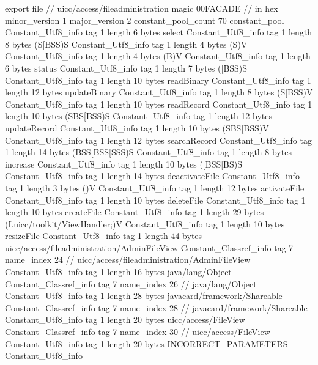 export file {		// uicc/access/fileadministration
	magic	00FACADE		 // in hex
	minor_version	1
	major_version	2
	constant_pool_count	70
	constant_pool {
		Constant_Utf8_info {
			tag	1
			length	6
			bytes	select
		}
		Constant_Utf8_info {
			tag	1
			length	8
			bytes	(S[BSS)S
		}
		Constant_Utf8_info {
			tag	1
			length	4
			bytes	(S)V
		}
		Constant_Utf8_info {
			tag	1
			length	4
			bytes	(B)V
		}
		Constant_Utf8_info {
			tag	1
			length	6
			bytes	status
		}
		Constant_Utf8_info {
			tag	1
			length	7
			bytes	([BSS)S
		}
		Constant_Utf8_info {
			tag	1
			length	10
			bytes	readBinary
		}
		Constant_Utf8_info {
			tag	1
			length	12
			bytes	updateBinary
		}
		Constant_Utf8_info {
			tag	1
			length	8
			bytes	(S[BSS)V
		}
		Constant_Utf8_info {
			tag	1
			length	10
			bytes	readRecord
		}
		Constant_Utf8_info {
			tag	1
			length	10
			bytes	(SBS[BSS)S
		}
		Constant_Utf8_info {
			tag	1
			length	12
			bytes	updateRecord
		}
		Constant_Utf8_info {
			tag	1
			length	10
			bytes	(SBS[BSS)V
		}
		Constant_Utf8_info {
			tag	1
			length	12
			bytes	searchRecord
		}
		Constant_Utf8_info {
			tag	1
			length	14
			bytes	(BSS[BSS[SSS)S
		}
		Constant_Utf8_info {
			tag	1
			length	8
			bytes	increase
		}
		Constant_Utf8_info {
			tag	1
			length	10
			bytes	([BSS[BS)S
		}
		Constant_Utf8_info {
			tag	1
			length	14
			bytes	deactivateFile
		}
		Constant_Utf8_info {
			tag	1
			length	3
			bytes	()V
		}
		Constant_Utf8_info {
			tag	1
			length	12
			bytes	activateFile
		}
		Constant_Utf8_info {
			tag	1
			length	10
			bytes	deleteFile
		}
		Constant_Utf8_info {
			tag	1
			length	10
			bytes	createFile
		}
		Constant_Utf8_info {
			tag	1
			length	29
			bytes	(Luicc/toolkit/ViewHandler;)V
		}
		Constant_Utf8_info {
			tag	1
			length	10
			bytes	resizeFile
		}
		Constant_Utf8_info {
			tag	1
			length	44
			bytes	uicc/access/fileadministration/AdminFileView
		}
		Constant_Classref_info {
			tag	7
			name_index	24		// uicc/access/fileadministration/AdminFileView
		}
		Constant_Utf8_info {
			tag	1
			length	16
			bytes	java/lang/Object
		}
		Constant_Classref_info {
			tag	7
			name_index	26		// java/lang/Object
		}
		Constant_Utf8_info {
			tag	1
			length	28
			bytes	javacard/framework/Shareable
		}
		Constant_Classref_info {
			tag	7
			name_index	28		// javacard/framework/Shareable
		}
		Constant_Utf8_info {
			tag	1
			length	20
			bytes	uicc/access/FileView
		}
		Constant_Classref_info {
			tag	7
			name_index	30		// uicc/access/FileView
		}
		Constant_Utf8_info {
			tag	1
			length	20
			bytes	INCORRECT_PARAMETERS
		}
		Constant_Utf8_info {
}}}
